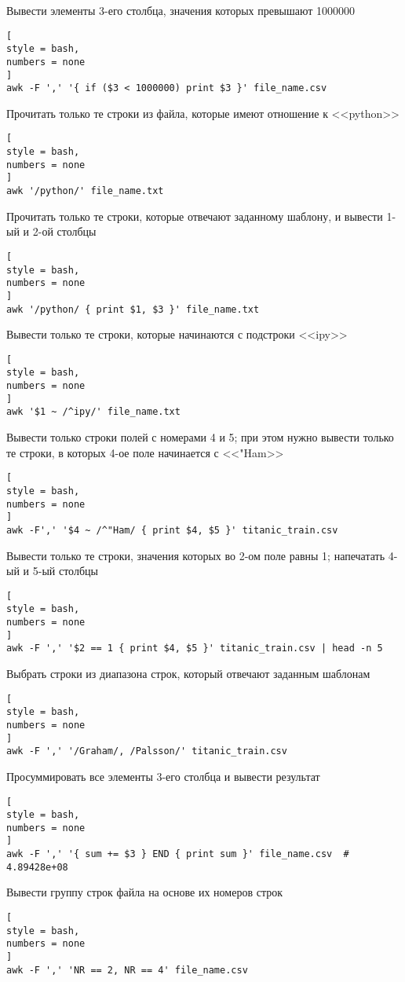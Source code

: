 \documentclass[%
	11pt,
	a4paper,
	utf8,
		]{article}
\begin{document}
Вывести элементы 3-его столбца, значения которых превышают 1000000
\begin{lstlisting}[
style = bash,
numbers = none
]
awk -F ',' '{ if ($3 < 1000000) print $3 }' file_name.csv
\end{lstlisting}

Прочитать только те строки из файла, которые имеют отношение к <<python>>
\begin{lstlisting}[
style = bash,
numbers = none
]
awk '/python/' file_name.txt
\end{lstlisting}

Прочитать только те строки, которые отвечают заданному шаблону, и вывести 1-ый и 2-ой столбцы
\begin{lstlisting}[
style = bash,
numbers = none
]
awk '/python/ { print $1, $3 }' file_name.txt
\end{lstlisting}

Вывести только те строки, которые начинаются с подстроки <<ipy>>
\begin{lstlisting}[
style = bash,
numbers = none
]
awk '$1 ~ /^ipy/' file_name.txt
\end{lstlisting}

Вывести только строки полей с номерами 4 и 5; при этом нужно вывести только те строки, в которых 4-ое поле начинается с <<"Ham>>
\begin{lstlisting}[
style = bash,
numbers = none
]
awk -F',' '$4 ~ /^"Ham/ { print $4, $5 }' titanic_train.csv
\end{lstlisting}

Вывести только те строки, значения которых во 2-ом поле равны 1; напечатать 4-ый и 5-ый столбцы
\begin{lstlisting}[
style = bash,
numbers = none
]
awk -F ',' '$2 == 1 { print $4, $5 }' titanic_train.csv | head -n 5
\end{lstlisting}

Выбрать строки из диапазона строк, который отвечают заданным шаблонам
\begin{lstlisting}[
style = bash,
numbers = none
]
awk -F ',' '/Graham/, /Palsson/' titanic_train.csv
\end{lstlisting}

Просуммировать все элементы 3-его столбца и вывести результат
\begin{lstlisting}[
style = bash,
numbers = none
]
awk -F ',' '{ sum += $3 } END { print sum }' file_name.csv  # 4.89428e+08
\end{lstlisting}

Вывести группу строк файла на основе их номеров строк
\begin{lstlisting}[
style = bash,
numbers = none
]
awk -F ',' 'NR == 2, NR == 4' file_name.csv
\end{lstlisting}
\end{document}
